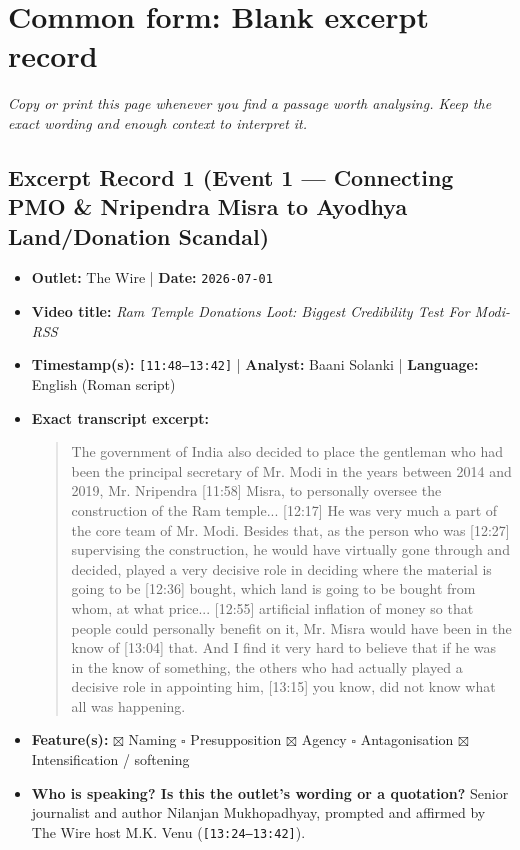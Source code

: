 \documentclass[10pt,a4paper]{article}
\begin{document}
\section*{Common form: Blank excerpt record}
\textit{Copy or print this page whenever you find a passage worth analysing. Keep the exact wording and enough context to interpret it.}


\subsection*{Excerpt Record 1 (Event 1 --- Connecting PMO \& Nripendra Misra to Ayodhya Land/Donation Scandal)}
\begin{itemize}[leftmargin=1.5em, itemsep=3pt, topsep=4pt]
  \item \textbf{Outlet:} The Wire | \textbf{Date:} \texttt{2026-07-01}
  \item \textbf{Video title:} \textit{Ram Temple Donations Loot: Biggest Credibility Test For Modi-RSS}
  \item \textbf{Timestamp(s):} \texttt{[11:48--13:42]} | \textbf{Analyst:} Baani Solanki | \textbf{Language:} English (Roman script)
  \item \textbf{Exact transcript excerpt:}
    \begin{quote}\small{} The government of India also decided to place the gentleman who had been the principal secretary of Mr. Modi in the years between 2014 and 2019, Mr. Nripendra [11:58] Misra, to personally oversee the construction of the Ram temple... [12:17] He was very much a part of the core team of Mr. Modi. Besides that, as the person who was [12:27] supervising the construction, he would have virtually gone through and decided, played a very decisive role in deciding where the material is going to be [12:36] bought, which land is going to be bought from whom, at what price... [12:55] artificial inflation of money so that people could personally benefit on it, Mr. Misra would have been in the know of [13:04] that. And I find it very hard to believe that if he was in the know of something, the others who had actually played a decisive role in appointing him, [13:15] you know, did not know what all was happening.\end{quote}
  \item \textbf{Feature(s):} $\boxtimes$ Naming $\square$ Presupposition $\boxtimes$ Agency $\square$ Antagonisation $\boxtimes$ Intensification / softening
  \item \textbf{Who is speaking? Is this the outlet's wording or a quotation?} Senior journalist and author Nilanjan Mukhopadhyay, prompted and affirmed by The Wire host M.K. Venu (\texttt{[13:24--13:42]}).

\end{itemize}
\end{document}
